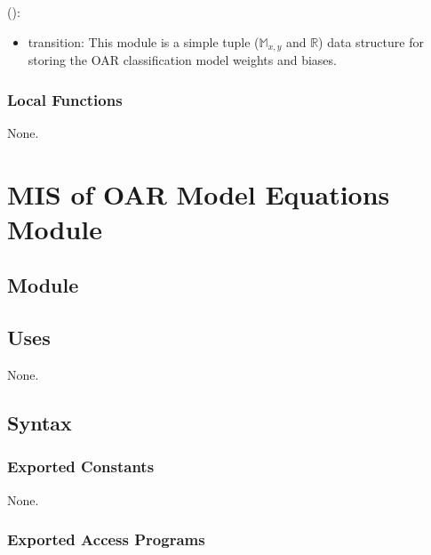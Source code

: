 \documentclass[12pt, titlepage]{article}
\begin{document}
\noindent {}():
\begin{itemize}
\item transition: This module is a simple tuple ($\mathbb{M}_{x, y}$ and $\mathbb{R}$) data structure for storing the OAR classification model weights and biases.
\end{itemize}

\subsubsection{Local Functions}

None.

\section{MIS of OAR Model Equations Module} \label{ModuleOME} 

\subsection{Module}


\subsection{Uses}

None.

\subsection{Syntax}

\subsubsection{Exported Constants}

None.

\subsubsection{Exported Access Programs}
\end{document}
